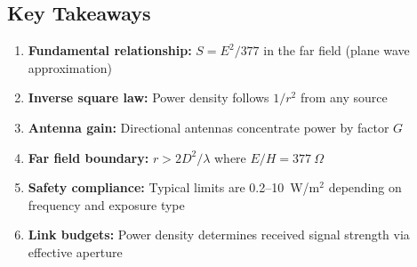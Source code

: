 \subsection{Key Takeaways}

\begin{enumerate}
\item \textbf{Fundamental relationship:} $S = E^2/377$ in the far field (plane wave approximation)
\item \textbf{Inverse square law:} Power density follows $1/r^2$ from any source
\item \textbf{Antenna gain:} Directional antennas concentrate power by factor $G$
\item \textbf{Far field boundary:} $r > 2D^2/\lambda$ where $E/H = 377~\Omega$
\item \textbf{Safety compliance:} Typical limits are 0.2--10~W/m$^2$ depending on frequency and exposure type
\item \textbf{Link budgets:} Power density determines received signal strength via effective aperture
\end{enumerate}

